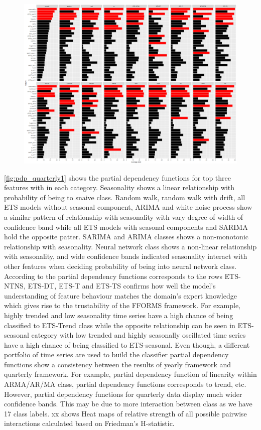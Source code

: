 \documentclass[11pt,a4paper,]{article}
\theoremstyle{definition}
\theoremstyle{definition}
\theoremstyle{definition}
\theoremstyle{remark}
\begin{document}
\begin{figure}[h]

{\centering \includegraphics{figures/vi_quarterly-1} 

}

\end{figure}

\autoref{fig:pdp_quarterly1} shows the partial dependency functions for
top three features with in each category. Seasonality shows a linear
relationship with probability of being to snaive class. Random walk,
random walk with drift, all ETS models without seasonal component, ARIMA
and white noise process show a similar pattern of relationship with
seasonality with vary degree of width of confidence band while all ETS
models with seasonal components and SARIMA hold the opposite patter.
SARIMA and ARIMA classes shows a non-monotonic relationship with
seasonality. Neural network class shows a non-linear relationship with
seasonality, and wide confidence bands indicated seasonality interact
with other features when deciding probability of being into neural
network class. According to the partial dependency functions corresponds
to the rows ETS-NTNS, ETS-DT, ETS-T and ETS-TS confirms how well the
model's understanding of feature behaviour matches the domain's expert
knowledge which gives rise to the trustability of the FFORMS framework.
For example, highly trended and low seasonality time series have a high
chance of being classified to ETS-Trend class while the opposite
relationship can be seen in ETS-seasonal category with low trended and
highly seasonally oscillated time series have a high chance of being
classified to ETS-seasonal. Even though, a different portfolio of time
series are used to build the classifier partial dependency functions
show a consistency between the results of yearly framework and quarterly
framework. For example, partial dependency function of linearity within
ARMA/AR/MA class, partial dependency functions corresponds to trend,
etc. However, partial dependency functions for quarterly data display
much wider confidence bands. This may be due to more interaction between
class as we have 17 class labels. xx shows Heat maps of relative
strength of all possible pairwise interactions calculated based on
Friedman's H-statistic.
\end{document}

